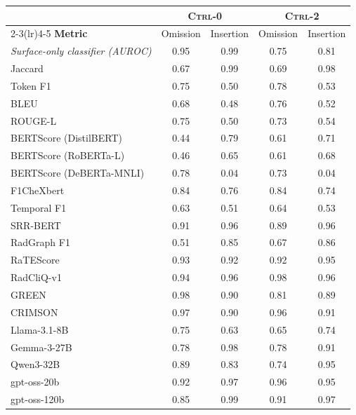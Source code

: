 \begin{tabular}{lcccc}
\toprule
 & \multicolumn{2}{c}{\textsc{Ctrl-0}} & \multicolumn{2}{c}{\textsc{Ctrl-2}} \\
\cmidrule(lr){2-3}\cmidrule(lr){4-5}
\textbf{Metric} & Omission & Insertion & Omission & Insertion \\
\midrule
\textit{Surface-only classifier (AUROC)} & 0.95 & 0.99 & 0.75 & 0.81 \\
\midrule
Jaccard & 0.67 & 0.99 & 0.69 & 0.98 \\
Token F1 & 0.75 & 0.50 & 0.78 & 0.53 \\
BLEU & 0.68 & 0.48 & 0.76 & 0.52 \\
ROUGE-L & 0.75 & 0.50 & 0.73 & 0.54 \\
BERTScore (DistilBERT) & 0.44 & 0.79 & 0.61 & 0.71 \\
BERTScore (RoBERTa-L) & 0.46 & 0.65 & 0.61 & 0.68 \\
BERTScore (DeBERTa-MNLI) & 0.78 & 0.04 & 0.73 & 0.04 \\
F1CheXbert & 0.84 & 0.76 & 0.84 & 0.74 \\
Temporal F1 & 0.63 & 0.51 & 0.64 & 0.53 \\
SRR-BERT & 0.91 & 0.96 & 0.89 & 0.96 \\
RadGraph F1 & 0.51 & 0.85 & 0.67 & 0.86 \\
RaTEScore & 0.93 & 0.92 & 0.92 & 0.95 \\
RadCliQ-v1 & 0.94 & 0.96 & 0.98 & 0.96 \\
GREEN & 0.98 & 0.90 & 0.81 & 0.89 \\
CRIMSON & 0.97 & 0.90 & 0.96 & 0.91 \\
Llama-3.1-8B & 0.75 & 0.63 & 0.65 & 0.74 \\
Gemma-3-27B & 0.78 & 0.98 & 0.78 & 0.91 \\
Qwen3-32B & 0.89 & 0.83 & 0.74 & 0.95 \\
gpt-oss-20b & 0.92 & 0.97 & 0.96 & 0.95 \\
gpt-oss-120b & 0.85 & 0.99 & 0.91 & 0.97 \\
\bottomrule
\end{tabular}